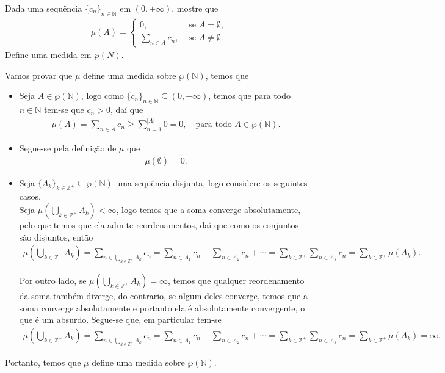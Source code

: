 \begin{homeworkProblem}[4]
  Dada uma sequência $\{c_n\}_{n\in\mathbb{N}}$ em $(0,+\infty)$, mostre que
  \begin{align*}
    \mu(A)=\begin{cases}
      0, &\text{ se } A=\emptyset \text{,} \\
      \displaystyle\sum_{n\in A}c_n, &\text{ se } A\neq\emptyset.
    \end{cases}
  \end{align*}
  Define uma medida em $\wp(N)$.
  \begin{solution}
    Vamos provar que $\mu$ define uma medida sobre $\wp(\mathbb{N})$, temos que
    \begin{itemize}
      \item Seja $A\in\wp(\mathbb{N})$, logo como $\{c_n\}_{n\in\mathbb{N}}\subseteq (0,+\infty)$, temos que para todo $n\in\mathbb{N}$ tem-se que $c_n>0$, daí que
        \begin{align*}
          \mu(A)=\sum_{n\in A}c_n\geq\sum_{n=1}^{|A|}0=0,\quad\text{para todo }A\in\wp(\mathbb{N}).
        \end{align*}
      \item Segue-se pela definição de $\mu$ que
        \begin{align*}
          \mu(\emptyset)=0.
        \end{align*}
      \item Seja $\{A_k\}_{k\in\mathbb{Z}^{+}}\subseteq\wp(\mathbb{N})$ uma sequência disjunta, logo considere os seguintes casos.\\

        Seja $\displaystyle\mu\left( \bigcup_{k\in\mathbb{Z}^{+}}A_k \right)<\infty$, logo temos que a soma converge absolutamente, pelo que temos que ela admite reordenamentos, daí que como os conjuntos são disjuntos, então
        \begin{align*}
          \mu\left( \bigcup_{k\in\mathbb{Z}^{+}}A_k \right)=\sum_{n\in\bigcup_{k\in\mathbb{Z}^{+}}A_k}c_n=\sum_{n\in A_1}c_n+\sum_{n\in A_2}c_n+\cdots=\sum_{k\in\mathbb{Z}^{+}}\sum_{n\in A_k}c_n=\sum_{k\in\mathbb{Z}^{+}}\mu(A_k).
        \end{align*}

        Por outro lado, se $\displaystyle\mu\left( \bigcup_{k\in\mathbb{Z}^{+}}A_k \right)=\infty$, temos que qualquer reordenamento da soma também diverge, do contrario, se algum deles converge, temos que a soma converge absolutamente e portanto ela é absolutamente convergente, o que é um absurdo. Segue-se que, em particular tem-se
        \begin{align*}
          \mu\left( \bigcup_{k\in\mathbb{Z}^{+}}A_k \right)=\sum_{n\in\bigcup_{k\in\mathbb{Z}^{+}}A_k}c_n=\sum_{n\in A_1}c_n+\sum_{n\in A_2}c_n+\cdots=\sum_{k\in\mathbb{Z}^{+}}\sum_{n\in A_k}c_n=\sum_{k\in\mathbb{Z}^{+}}\mu(A_k)=\infty.
        \end{align*}
    \end{itemize}
    Portanto, temos que $\mu$ define uma medida sobre $\wp(\mathbb{N})$. 
  \end{solution}
\end{homeworkProblem}
